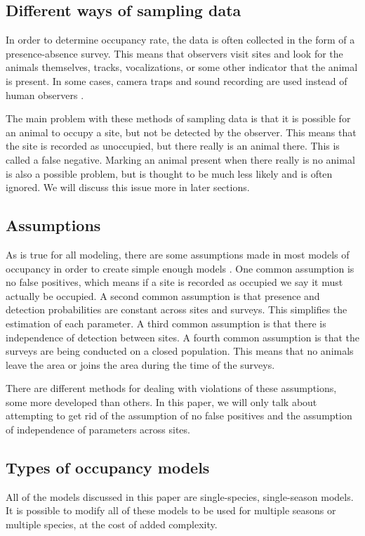 \documentclass[12pt]{article}
\begin{document}
	
    \subsection{Different ways of sampling data}
    In order to determine occupancy rate, the data is often collected in the
    form of a presence-absence survey. This means that observers visit sites and
    look for the animals themselves, tracks, vocalizations, or some other
    indicator that the animal is present. In some cases, camera traps and sound
    recording are used instead of human observers \cite{MacKenzie2006}.

    The main problem with these methods of sampling data is that it is possible
    for an animal to occupy a site, but not be detected by the observer. This
    means that the site is recorded as unoccupied, but there really is an animal
    there. This is called a false negative. Marking an animal present when there
    really is no animal is also a possible problem, but is thought to be much
    less likely and is often ignored. We will discuss this issue more in later sections.

    \subsection{Assumptions}
    As is true for all modeling, there are some assumptions made in most models of occupancy 
in order to create simple enough models \cite{MacKenzie2006}. One common assumption is no false positives, which means if a
    site is recorded as occupied we say it must actually be occupied. A second
    common assumption is that presence and detection probabilities are constant
    across sites and surveys. This simplifies the estimation of each parameter.
    A third common assumption is that there is independence of detection between
    sites. A fourth common assumption is that the surveys are being conducted on
    a closed population. This means that no animals leave the area or joins the
    area during the time of the surveys.

    There are different methods for dealing with violations of these assumptions, some 
more developed than others.  In this paper, we will only talk about attempting to get rid of the
    assumption of no false positives and the assumption of independence of
    parameters across sites.

    \subsection{Types of occupancy models}
    All of the models discussed in this paper are single-species, single-season
    models. It is possible to modify all of these models to be used for multiple
    seasons or multiple species, at the cost of added complexity.
\end{document}
